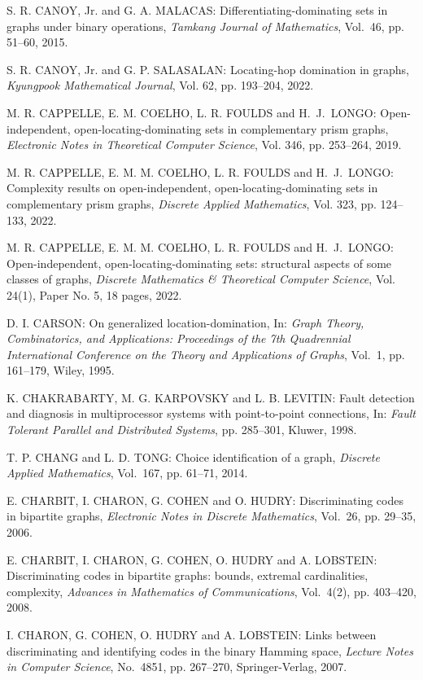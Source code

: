 \begin{thebibliography}{999}
S. R. CANOY, Jr. and G. A. MALACAS: Differentiating-dominating sets in graphs under binary operations, {\it Tamkang Journal of Mathematics}, Vol.~46, pp. 51--60, 2015.

S. R. CANOY, Jr. and G. P. SALASALAN: Locating-hop domination in graphs, {\it Kyungpook Mathematical Journal}, Vol. 62, pp. 193--204, 2022.

M. R. CAPPELLE, E. M. COELHO, L. R. FOULDS and H.~J.~LONGO: Open-independent, open-locating-dominating sets in complementary prism graphs, {\it Electronic Notes in Theoretical Computer Science}, Vol. 346, pp. 253--264, 2019.

M. R. CAPPELLE, E. M. M. COELHO, L. R. FOULDS and H.~J.~LONGO: Complexity results on open-independent, open-locating-dominating sets in complementary prism graphs, {\it Discrete Applied Mathematics}, Vol. 323, pp. 124--133, 2022.

M. R. CAPPELLE, E. M. M. COELHO, L. R. FOULDS and H.~J.~LONGO: Open-independent, open-locating-dominating sets: structural aspects of some classes of graphs, {\it Discrete Mathematics \& Theoretical Computer Science}, Vol. 24(1), Paper No. 5, 18 pages, 2022.

D. I. CARSON: On generalized location-domination, In: {\it Graph Theory, Combinatorics, and Applications: Proceedings of the 7th Quadrennial International Conference on the Theory and Applications of Graphs}, Vol.~1, pp. 161--179, Wiley, 1995.

K. CHAKRABARTY, M. G. KARPOVSKY and L. B. LEVITIN: Fault detection and diagnosis in multiprocessor systems with point-to-point connections, In: {\it Fault Tolerant Parallel and Distributed Systems}, pp. 285--301, Kluwer, 1998. 

T. P. CHANG and L. D. TONG: Choice identification of a graph, {\it Discrete Applied Mathematics}, Vol.~167, pp. 61--71, 2014.

E. CHARBIT, I. CHARON, G. COHEN and O. HUDRY: Discriminating codes in bipartite graphs, {\it Electronic Notes in Discrete Mathematics}, Vol.~26, pp. 29--35, 2006.

E. CHARBIT, I. CHARON, G. COHEN, O. HUDRY and A. LOBSTEIN: Discriminating codes in bipartite graphs: bounds, extremal cardinalities, complexity, {\it Advances in Mathematics of Communications}, Vol.~4(2), pp. 403--420, 2008.

I. CHARON, G. COHEN, O. HUDRY and A. LOBSTEIN: Links between discriminating and identifying codes in the binary Hamming space, {\it Lecture Notes in Computer Science}, No.~4851, pp. 267--270, Springer-Verlag, 2007.


\end{thebibliography}
